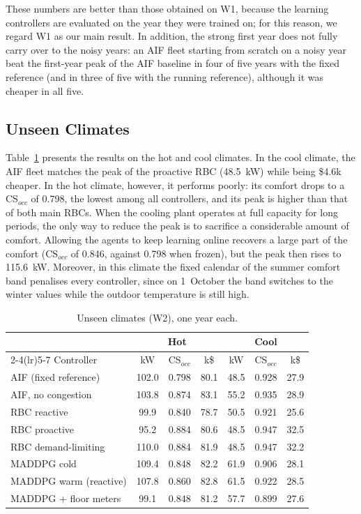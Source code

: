 \documentclass[conference]{IEEEtran}
\begin{document}
These numbers are better than those obtained on W1, because the learning
controllers are evaluated on the year they were trained on; for this reason, we
regard W1 as our main result. In addition, the strong first year does not fully
carry over to the noisy years: an AIF fleet starting from scratch on a noisy
year beat the first-year peak of the AIF baseline in four of five years with
the fixed reference (and in three of five with the running reference), although
it was cheaper in all five.

\subsection{Unseen Climates}

Table~\ref{tab:w2} presents the results on the hot and cool climates. In the
cool climate, the AIF fleet matches the peak of the proactive RBC
(\SI{48.5}{\kilo\watt}) while being \$4.6k cheaper. In the hot climate,
however, it performs poorly: its comfort drops to a $\mathrm{CS}_{occ}$ of
0.798, the lowest among all controllers, and its peak is higher than that of
both main RBCs. When the cooling plant operates at full capacity for long
periods, the only way to reduce the peak is to sacrifice a considerable amount
of comfort. Allowing the agents to keep learning online recovers a large part
of the comfort ($\mathrm{CS}_{occ}$ of 0.846, against 0.798 when frozen), but
the peak then rises to \SI{115.6}{\kilo\watt}. Moreover, in this climate the
fixed calendar of the summer comfort band penalises every controller, since on
1~October the band switches to the winter values while the outdoor temperature
is still high.

\begin{table}[t]
\caption{Unseen climates (W2), one year each.}
\label{tab:w2}
\centering
\footnotesize
\setlength{\tabcolsep}{3pt}
\begin{tabular}{lcccccc}
\toprule
 & \multicolumn{3}{c}{Hot} & \multicolumn{3}{c}{Cool} \\
\cmidrule(lr){2-4}\cmidrule(lr){5-7}
Controller & kW & CS$_{occ}$ & k\$ & kW & CS$_{occ}$ & k\$ \\
\midrule
AIF (fixed reference)   & 102.0 & 0.798 & 80.1 & 48.5 & 0.928 & 27.9 \\
AIF, no congestion      & 103.8 & 0.874 & 83.1 & 55.2 & 0.935 & 28.9 \\
RBC reactive            & 99.9  & 0.840 & 78.7 & 50.5 & 0.921 & 25.6 \\
RBC proactive           & 95.2  & 0.884 & 80.6 & 48.5 & 0.947 & 32.5 \\
RBC demand-limiting     & 110.0 & 0.884 & 81.9 & 48.5 & 0.947 & 32.2 \\
MADDPG cold             & 109.4 & 0.848 & 82.2 & 61.9 & 0.906 & 28.1 \\
MADDPG warm (reactive)  & 107.8 & 0.860 & 82.8 & 61.5 & 0.922 & 28.5 \\
MADDPG + floor meters   & 99.1  & 0.848 & 81.2 & 57.7 & 0.899 & 27.6 \\
\bottomrule
\end{tabular}
\end{table}
\end{document}
